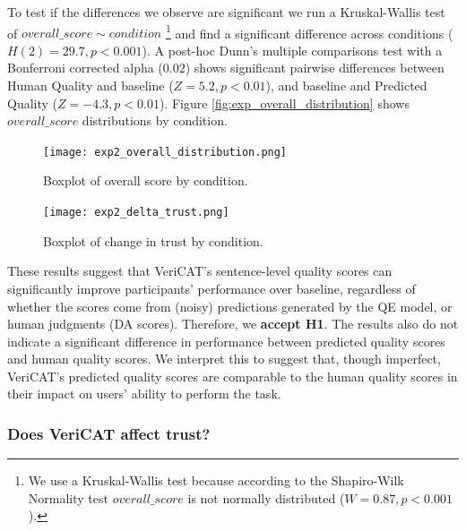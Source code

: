 To test if the differences we observe are significant we run a Kruskal-Wallis test of $overall\_score \sim condition$ \footnote{We use a Kruskal-Wallis test because according to the Shapiro-Wilk Normality test $overall\_score$ is not normally distributed ($W = 0.87, p < 0.001$).} and find a significant difference across conditions ($H(2) = 29.7, p < 0.001$). A post-hoc Dunn’s multiple comparisons test with a Bonferroni corrected alpha ($0.02$) shows significant pairwise differences between Human Quality and baseline ($Z = 5.2, p < 0.01$), and baseline and Predicted Quality ($Z = -4.3, p < 0.01$). Figure \ref{fig:exp_overall_distribution} shows $overall\_score$ distributions by condition. 

\begin{figure}[h!]
  \centering
  \begin{minipage}[b]{0.45\textwidth}
    
    \texttt{[image: exp2\_overall\_distribution.png]}
    \caption{Boxplot of overall score by condition.}
    \label{fig:exp_overall_distribution}
    
  \end{minipage}
  \hfill
  \begin{minipage}[b]{0.45\textwidth}
  
    \texttt{[image: exp2\_delta\_trust.png]}
    \caption{Boxplot of change in trust by condition.}
    \label{fig:exp_delta_trust}
    
  \end{minipage}
\end{figure}

These results suggest that VeriCAT's sentence-level quality scores can significantly improve participants’ performance over baseline, regardless of whether the scores come from (noisy) predictions generated by the QE model, or human judgments (DA scores). Therefore, we \textbf{accept H1}. The results also do not indicate a significant difference in performance between predicted quality scores and human quality scores. We interpret this to suggest that, though imperfect, VeriCAT's predicted quality scores are comparable to the human quality scores in their impact on users' ability to perform the task. 

\subsubsection{\textbf{Does VeriCAT affect trust?}}


